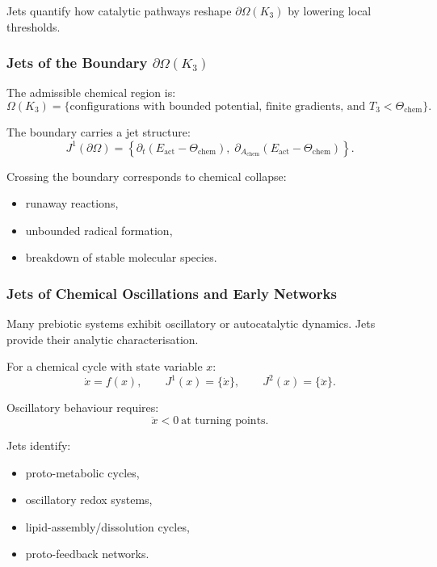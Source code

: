 Jets quantify how catalytic pathways reshape $\partial\Omega(K_3)$ by
lowering local thresholds.



\subsubsection{Jets of the Boundary \texorpdfstring{\texorpdfstring{$\partial\Omega(K_3)$}{\partial\Omega(K_3)}}{Boundary}}

The admissible chemical region is:
\[
\Omega(K_3)=
\{
\text{configurations with bounded potential, finite gradients, and }
T_3 < \Theta_{\mathrm{chem}}
\}.
\]

The boundary carries a jet structure:
\[
J^1(\partial\Omega)=
\left\{
\partial_t(E_{\mathrm{act}}-\Theta_{\mathrm{chem}}),\;
\partial_{A_{\mathrm{chem}}}(E_{\mathrm{act}}-\Theta_{\mathrm{chem}})
\right\}.
\]

Crossing the boundary corresponds to chemical collapse:

\begin{itemize}
    \item runaway reactions,
    \item unbounded radical formation,
    \item breakdown of stable molecular species.
\end{itemize}



\subsubsection{Jets of Chemical Oscillations and Early Networks}

Many prebiotic systems exhibit oscillatory or autocatalytic dynamics.
Jets provide their analytic characterisation.

For a chemical cycle with state variable $x$:
\[
\dot{x}=f(x),
\qquad
J^1(x)=\{\dot{x}\},
\qquad
J^2(x)=\{\ddot{x}\}.
\]

Oscillatory behaviour requires:
\[
\ddot{x}<0\ \text{at turning points}.
\]

Jets identify:

\begin{itemize}
    \item proto-metabolic cycles,
    \item oscillatory redox systems,
    \item lipid-assembly/dissolution cycles,
    \item proto-feedback networks.
\end{itemize}




